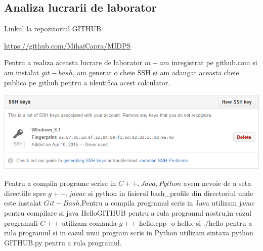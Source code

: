 \subsection{Analiza lucrarii de laborator}
Linkul la repozitoriul GITHUB:
\begin{center}
\url{https://github.com/MihaiCapra/MIDPS}
\end{center}
Pentru a realiza aceasta lucrare de laborator $m-am$ inregistrat pe github.com si am instalat $git-bash$, am generat o cheie SSH si am adaugat aceasta cheie publica pe github pentru a identifica acest calculator.\\
\begin{center}
\includegraphics[scale=0.5]{images/github_ssh}
\end{center}
Pentru a compila programe scrise in $C++,Java,Python$ avem nevoie de a seta directiile spre $g++,javac$ si python in fisierul bash\_profile din directoriul unde este instalat $Git-Bash$.Pentru a compila programul scris in Java utilizam javac pentru compilare si java HelloGITHUB pentru a rula programul nostru,in cazul programuli $C++$ utilizam comanda $g++ $ hello.cpp -o hello, si ./hello pentru a rula programul si in cazul unui program scris in Python utilizam sintaxa python GITHUB.py pentru a rula programul.
